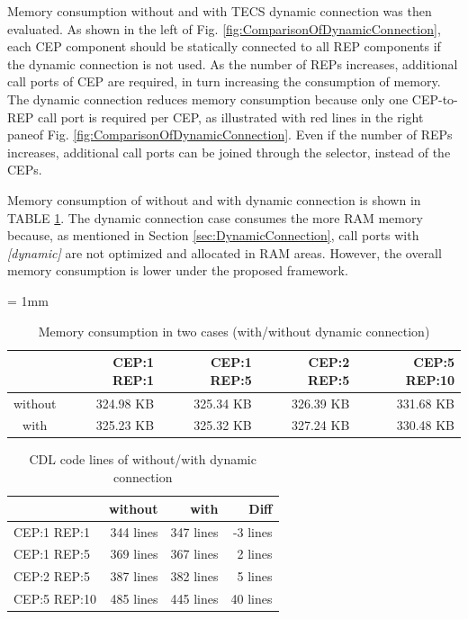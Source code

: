 \documentclass[a4j,12pt,oneside,openany,english]{jsbook}
\begin{document}
Memory consumption without and with TECS dynamic connection was then evaluated.
As shown in the left of Fig. \ref{fig:ComparisonOfDynamicConnection}, each CEP component should be statically connected to all REP components if the dynamic connection is not used.
As the number of REPs increases, additional call ports of CEP are required, in turn increasing the consumption of memory. 
The dynamic connection reduces memory consumption because only one CEP-to-REP call port is required per CEP, as illustrated with red lines in the right paneof Fig. \ref{fig:ComparisonOfDynamicConnection}.
Even if the number of REPs increases, additional call ports can be joined through the selector, instead of the CEPs.

Memory consumption of without and with dynamic connection is shown in TABLE \ref{fig:EvaluationOfDynamicConnection}.
The dynamic connection case consumes the more RAM memory because, as mentioned in Section \ref{sec:DynamicConnection}, call ports with {\it [dynamic]} are not optimized and allocated in RAM areas.
However, the overall memory consumption is lower under the proposed framework.

\begin{table}[t]
    \centering
    \caption{Memory consumption in two cases (with/without dynamic connection)}
    {\tabcolsep = 1mm
    \begin{tabular}{c|r|r|r|r}
        \hline\hline
                &  CEP:1 REP:1 & CEP:1 REP:5 & CEP:2 REP:5 & CEP:5 REP:10 \\ \hline
        without &  324.98 KB   & 325.34 KB   & 326.39 KB   & 331.68 KB   \\
        with    &  325.23 KB   & 325.32 KB   & 327.24 KB   & 330.48 KB   \\
        \hline
    \end{tabular}
    }
    \label{fig:EvaluationOfDynamicConnection}
\end{table}

\begin{table}[t]
    \centering
    \caption{CDL code lines of without/with dynamic connection}
    \begin{tabular}{l|r|r|r}
        \hline\hline
                     &  without  &  with  &  Diff  \\ \hline
        CEP:1 REP:1  &  344 lines     &  347 lines  &  -3 lines   \\
        CEP:1 REP:5  &  369 lines     &  367 lines  &   2 lines   \\
        CEP:2 REP:5  &  387 lines     &  382 lines  &   5 lines   \\
        CEP:5 REP:10 &  485 lines     &  445 lines  &  40 lines   \\
        \hline
    \end{tabular}
    \label{tab:EvaluationOfConfigurabilityByDynamicConnection}
\end{table}
\end{document}
